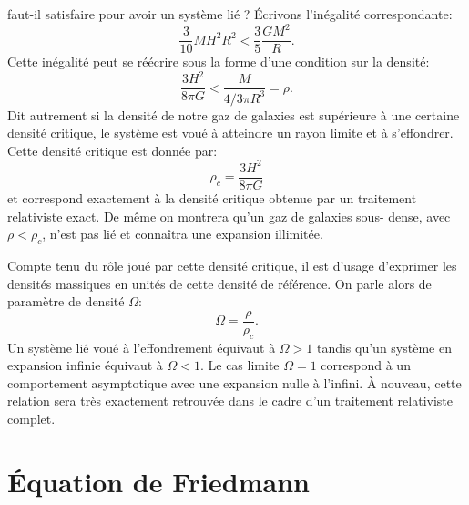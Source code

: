  faut-il satisfaire pour avoir un système lié ? Écrivons l'inégalité correspondante:
\begin{equation}
\frac{3}{10} M H^2 R^2 <\frac{3}{5}\frac{GM^2}{R}.
\end{equation}
Cette inégalité peut se réécrire sous la forme d'une condition sur la densité:
\begin{equation}
\frac{3H^2}{8\pi G}< \frac{M}{4/3\pi R^3}=\rho.
\end{equation}
Dit autrement si la densité de notre gaz de galaxies est supérieure à une certaine densité critique, le système est voué à atteindre un rayon limite et à s'effondrer. Cette densité critique  est donnée par:
\begin{equation}
\rho_c =\frac{3H^2}{8\pi G}
\end{equation}
et correspond exactement à la densité critique obtenue par un traitement relativiste exact. De même on montrera qu'un gaz de galaxies sous- dense, avec $\rho< \rho_c$, n'est pas lié et  connaîtra une expansion illimitée. 

Compte tenu du rôle joué par cette densité critique, il est d'usage d'exprimer les densités massiques en unités de cette densité de référence. On parle alors de paramètre de densité  $\Omega$:
\begin{equation}
\Omega=\frac{\rho}{\rho_c}.
\end{equation}
Un système lié voué à l'effondrement équivaut à $\Omega>1$ tandis qu'un système en expansion infinie équivaut à $\Omega<1$. Le cas limite $\Omega=1$ correspond à un comportement asymptotique avec une expansion nulle à l'infini. À nouveau, cette relation sera très exactement retrouvée dans le cadre d'un traitement relativiste complet.

\section{Équation de Friedmann}

